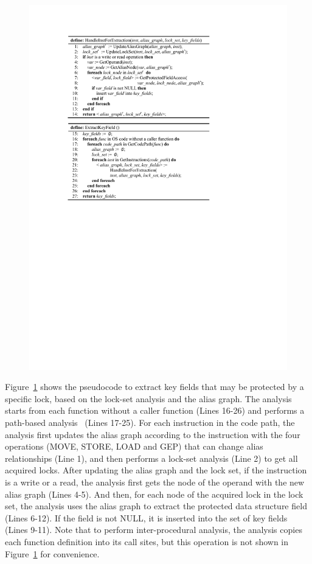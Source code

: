 \begin{figure}[htbp]
	\centering
	\includegraphics[width=1\linewidth]{figures/fig_pseudocode_field_extract.pdf}
	\label{fig_pseudocode_field_extract}
\end{figure}

Figure~\ref{fig_pseudocode_field_extract} shows the pseudocode to extract key 
fields that may be protected by a specific lock, based on the lock-set analysis 
and the alias graph. The analysis starts from each function without a caller 
function (Lines 16-26) and performs a path-based analysis~\cite{Li:ASPLOS22} 
(Lines 17-25). For each instruction in the code path, the analysis first 
updates the alias graph according to the instruction with the four operations 
(MOVE, STORE, LOAD and GEP) that can change alias relationships (Line 1), and 
then performs a lock-set analysis (Line 2) to get all acquired locks. After 
updating the alias graph and the lock set, if the instruction is a write or a 
read, the analysis first gets the node of the operand with the new alias graph 
(Lines 4-5). And then, for each node of the acquired lock in the lock set, the 
analysis uses the alias graph to extract the protected data structure field 
(Lines 6-12). If the field is not NULL, it is inserted into the set of key 
fields (Lines 9-11). Note that to perform inter-procedural analysis, the 
analysis copies each function definition into its call sites, but this 
operation is not shown in Figure~\ref{fig_pseudocode_field_extract} for 
convenience. 

